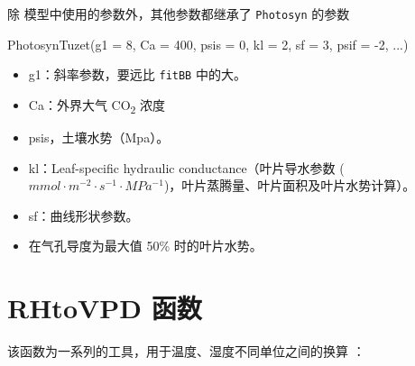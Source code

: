 \documentclass[
]{krantz}
\makeatletter
\newenvironment{Shaded}{\begin{snugshade}}{\end{snugshade}}
\newcommand{\AttributeTok}[1]{\textcolor[rgb]{0.77,0.63,0.00}{#1}}
\newcommand{\DecValTok}[1]{\textcolor[rgb]{0.00,0.00,0.81}{#1}}
\newcommand{\FunctionTok}[1]{\textcolor[rgb]{0.00,0.00,0.00}{#1}}
\newcommand{\NormalTok}[1]{#1}
\newcommand{\SpecialCharTok}[1]{\textcolor[rgb]{0.00,0.00,0.00}{#1}}
\providecommand{\tightlist}{%
  \setlength{\itemsep}{0pt}\setlength{\parskip}{0pt}}
\newenvironment{kframe}{%
\medskip{}
\setlength{\fboxsep}{.8em}
 \def\at@end@of@kframe{}%
 \ifinner\ifhmode%
  \def\at@end@of@kframe{\end{minipage}}%
  \begin{minipage}{\columnwidth}%
 \fi\fi%
 \def\FrameCommand##1{\hskip\@totalleftmargin \hskip-\fboxsep
 \colorbox{shadecolor}{##1}\hskip-\fboxsep
     \hskip-\linewidth \hskip-\@totalleftmargin \hskip\columnwidth}%
 \MakeFramed {\advance\hsize-\width
   \@totalleftmargin\z@ \linewidth\hsize
   \@setminipage}}%
 {\par\unskip\endMakeFramed%
 \at@end@of@kframe}
\renewenvironment{Shaded}{\begin{kframe}}{\end{kframe}}
\makeatother
\begin{document}
除 \citet{tuzet2003a} 模型中使用的参数外，其他参数都继承了 \texttt{Photosyn} 的参数

\begin{Shaded}
\begin{Highlighting}[]
\FunctionTok{PhotosynTuzet}\NormalTok{(}\AttributeTok{g1 =} \DecValTok{8}\NormalTok{, }\AttributeTok{Ca =} \DecValTok{400}\NormalTok{, }\AttributeTok{psis =} \DecValTok{0}\NormalTok{,}
              \AttributeTok{kl =} \DecValTok{2}\NormalTok{, }\AttributeTok{sf =} \DecValTok{3}\NormalTok{, }\AttributeTok{psif =} \SpecialCharTok{{-}}\DecValTok{2}\NormalTok{,}
\NormalTok{...)}
\end{Highlighting}
\end{Shaded}

\begin{itemize}
\tightlist
\item
  g1：斜率参数，要远比 \texttt{fitBB} 中的大。
\item
  Ca：外界大气 CO\textsubscript{2} 浓度
\item
  psis，土壤水势（Mpa）。
\item
  kl：Leaf-speciﬁc hydraulic conductance（叶片导水参数 (\(mmol \cdot m^{-2} \cdot s^{-1} \cdot MPa^{-1}\))，叶片蒸腾量、叶片面积及叶片水势计算）。
\item
  sf：曲线形状参数。
\item
  在气孔导度为最大值 50\% 时的叶片水势。
\end{itemize}

\cleardoublepage

\hypertarget{rhtovpd}{%
\chapter{RHtoVPD 函数}\label{rhtovpd}}

该函数为一系列的工具，用于温度、湿度不同单位之间的换算 \citet{Jones1993Plants} ：
\end{document}
